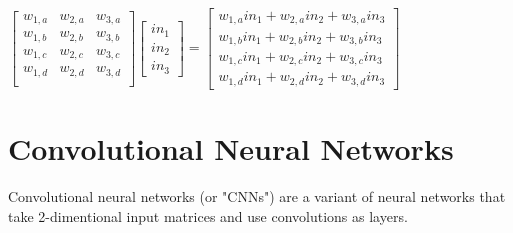 \documentclass{article}
\begin{document}
\begin{center}
    $\begin{bmatrix}
        w_{1,a} & w_{2,a} & w_{3,a} \\ 
        w_{1,b} & w_{2,b} & w_{3,b} \\ 
        w_{1,c} & w_{2,c} & w_{3,c} \\ 
        w_{1,d} & w_{2,d} & w_{3,d} \\ 
    \end{bmatrix}\begin{bmatrix}
        in_1 \\ in_2 \\ in_3
    \end{bmatrix} = \begin{bmatrix}
        w_{1,a}in_1+w_{2,a}in_2+w_{3,a}in_3 \\
        w_{1,b}in_1+w_{2,b}in_2+w_{3,b}in_3 \\
        w_{1,c}in_1+w_{2,c}in_2+w_{3,c}in_3 \\
        w_{1,d}in_1+w_{2,d}in_2+w_{3,d}in_3
    \end{bmatrix}$
\end{center}

\section{Convolutional Neural Networks}
Convolutional neural networks (or "CNNs") are a variant of neural networks that take 2-dimentional input matrices and use convolutions as layers. 
\end{document}
